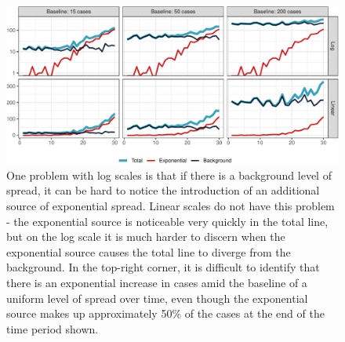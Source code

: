 \documentclass[article]{jdssv}\usepackage[]{graphicx}\usepackage[]{color}
\newenvironment{knitrout}{}{} %
\begin{document}
\begin{knitrout}\footnotesize
{}\color{fgcolor}\begin{figure}

{\centering \includegraphics[width=.95\linewidth]{Figures_R/fig-log-scale-failures-1} 

}

\caption[One problem with log scales is that if there is a background level of spread, it can be hard to notice the introduction of an additional source of exponential spread]{One problem with log scales is that if there is a background level of spread, it can be hard to notice the introduction of an additional source of exponential spread. Linear scales do not have this problem - the exponential source is noticeable very quickly in the total line, but on the log scale it is much harder to discern when the exponential source causes the total line to diverge from the background. In the top-right corner, it is difficult to identify that there is an exponential increase in cases amid the baseline of a uniform level of spread over time, even though the exponential source makes up approximately 50\% of the cases at the end of the time period shown.}\label{fig:log-scale-failures}
\end{figure}

\end{knitrout}

\end{document}
